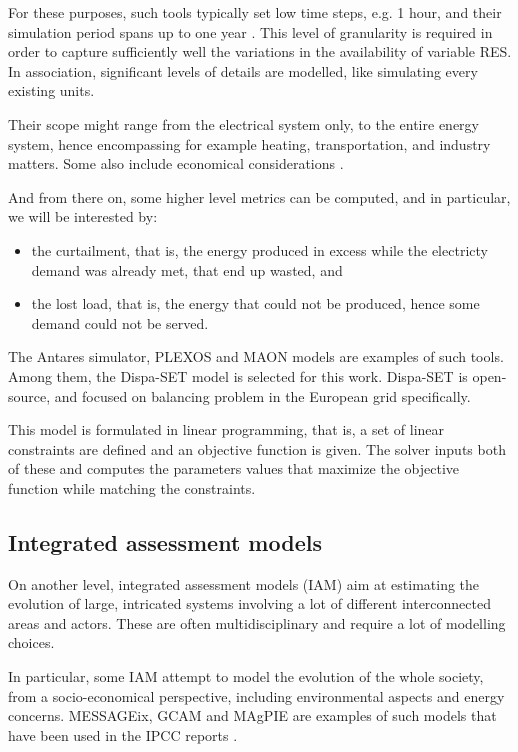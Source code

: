 For these purposes, such tools typically set low time steps, e.g. 1 hour, and their simulation period spans up to one year \cite{short-term-dispatch-1}. This level of granularity is required in order to capture sufficiently well the variations in the availability of variable RES. In association, significant levels of details are modelled, like simulating every existing units. 

Their scope might range from the electrical system only, to the entire energy system, hence encompassing for example heating, transportation, and industry matters. Some also include economical considerations \cite{Antares}.

And from there on, some higher level metrics can be computed, and in particular, we will be interested by:
\begin{itemize}
    \item the curtailment, that is, the energy produced in excess while the electricty demand was already met, that end up wasted, and
    \item the lost load, that is, the energy that could not be produced, hence some demand could not be served.
\end{itemize}

The Antares simulator, PLEXOS and MAON models are examples of such tools. Among them, the Dispa-SET model \cite{dispaset} is selected for this work. Dispa-SET is open-source, and focused on balancing problem in the European grid specifically.

This model is formulated in linear programming, that is, a set of linear constraints are defined and an objective function is given. The solver inputs both of these and computes the parameters values that maximize the objective function while matching the constraints.

\subsection{Integrated assessment models}

On another level, integrated assessment models (IAM) aim at estimating the evolution of large, intricated systems involving a lot of different interconnected areas and actors. These are often multidisciplinary and require a lot of modelling choices.

In particular, some IAM attempt to model the evolution of the whole society, from a socio-economical perspective, including environmental aspects and energy concerns. MESSAGEix, GCAM and MAgPIE are examples of such models that have been used in the IPCC reports \cite{GCAM} \cite{MESSAGEix} \cite{Antares} \cite{ipcc-thing}.

